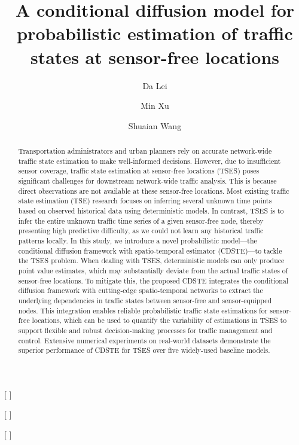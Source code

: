 \documentclass[a4paper,fleqn,12pt]{cas-sc}
\newcommand{\rev}[1]{{\color{red} #1}}
\begin{document}
\let\WriteBookmarks\relax
\def\floatpagepagefraction{1}
\def\textpagefraction{.001}

\title [mode = title]{A conditional diffusion model for probabilistic estimation of traffic states at sensor-free locations}   

\author[1]{Da Lei}[%
]

\address[1]{Department of Logistics and Maritime Studies, Faculty of Business, The Hong Kong Polytechnic University, Hung Hom, Hong Kong}
\address[2]{Department of Industrial and Systems Engineering, The Hong Kong Polytechnic University, Hung Hom, Hong Kong}


\author[2]{Min Xu}[%
]
\cormark[1]

\author[1]{Shuaian Wang}[%
]



\begin{abstract}
Transportation administrators and urban planners rely on accurate network-wide traffic state estimation to make well-informed decisions. However, due to insufficient sensor coverage, traffic state estimation at sensor-free locations (TSES) poses significant challenges for downstream network-wide traffic analysis. This is because direct observations are not available at these sensor-free locations. Most existing traffic state estimation (TSE) research focuses on inferring several unknown time points based on observed historical data using deterministic models. \rev{In contrast, TSES is to infer the entire unknown traffic time series of a given sensor-free node, thereby presenting high predictive difficulty, as we could not learn any historical traffic patterns locally.} In this study, we introduce a novel probabilistic model---the conditional diffusion framework with spatio-temporal estimator (CDSTE)---to tackle the TSES problem. When dealing with TSES, deterministic models can only produce point value estimates, which may substantially deviate from the actual traffic states of sensor-free locations. To mitigate this, the proposed CDSTE integrates the conditional diffusion framework with cutting-edge spatio-temporal networks to extract the underlying dependencies in traffic states between sensor-free and sensor-equipped nodes. \rev{This integration enables reliable probabilistic traffic state estimations for sensor-free locations, which can be used to quantify the variability of estimations in TSES to support flexible and robust decision-making processes for traffic management and control.} Extensive numerical experiments on real-world datasets demonstrate the superior performance of CDSTE for TSES over five widely-used baseline models.
\end{abstract}
\end{document}
